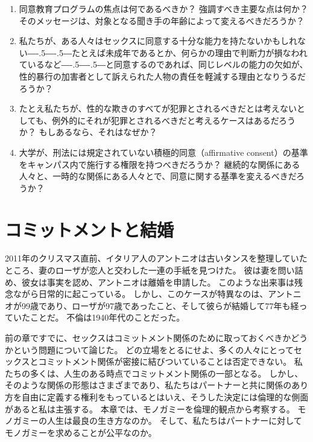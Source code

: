 \documentclass[paper=a4,book,openany]{jlreq}
\def\DDASH{―\kern-.5\zw―\kern-.5\zw―} %
\begin{document}
\begin{enumerate}

\item 同意教育プログラムの焦点は何であるべきか？ 強調すべき主要な点は何か？ そのメッセージは、対象となる聞き手の年齢によって変えるべきだろうか？

\item  私たちが、ある人々はセックスに同意する十分な能力を持たないかもしれない{\DDASH}たとえば未成年であるとか、何らかの理由で判断力が損なわれているなど{\DDASH}と同意するのであれば、同じレベルの能力の欠如が、性的暴行の加害者として訴えられた人物の責任を軽減する理由となりうるだろうか？

\item  たとえ私たちが、性的な欺きのすべてが犯罪とされるべきだとは考えないとしても、例外的にそれが犯罪とされるべきだと考えるケースはあるだろうか？ もしあるなら、それはなぜか？

\item  大学が、刑法には規定されていない積極的同意（affirmative consent）の基準をキャンパス内で施行する権限を持つべきだろうか？ 継続的な関係にある人々と、一時的な関係にある人々とで、同意に関する基準を変えるべきだろうか？
\end{enumerate}

\chapter{コミットメントと結婚}

2011年のクリスマス直前、イタリア人のアントニオは古いタンスを整理していたところ、妻のローザが恋人と交わした一連の手紙を見つけた。
彼は妻を問い詰め、彼女は事実を認め、アントニオは離婚を申請した。
このような出来事は残念ながら日常的に起こっている。
しかし、このケースが特異なのは、アントニオが99歳であり、ローザが97歳であったこと、そして彼らが結婚して77年も経っていたことだ。
不倫は1940年代のことだった\citep{squires11:_divor_wife_he_discov_affair}。

前の章ですでに、セックスはコミットメント関係のために取っておくべきかどうかという問題について論じた。
どの立場をとるにせよ、多くの人々にとってセックスとコミットメント関係が密接に結びついていることは否定できない。
私たちの多くは、人生のある時点でコミットメント関係の一部となる。
しかし、そのような関係の形態はさまざまであり、私たちはパートナーと共に関係のあり方を自由に定義する権利をもっているとはいえ、そうした決定には倫理的な側面があると私は主張する。
本章では、モノガミーを倫理的観点から考察する。
モノガミーの人生は最良の生き方なのか。
そして、私たちはパートナーに対してモノガミーを求めることが公平なのか。
\end{document}
